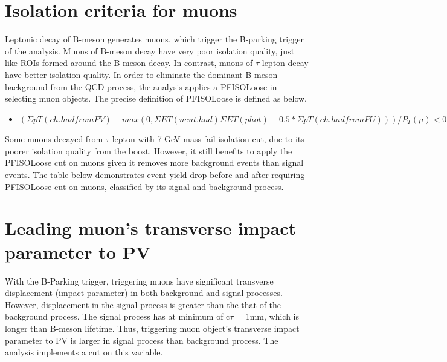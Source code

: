 \section{Isolation criteria for muons}\label{ref:muISO}
Leptonic decay of B-meson generates muons, which trigger the B-parking trigger of the analysis.
Muons of B-meson decay have very poor isolation quality, just like ROIs formed around the B-meson decay.
In contrast, muons of $\tau$ lepton decay have better isolation quality.
In order to eliminate the dominant B-meson background from the QCD process, the analysis applies a PFISOLoose in selecting muon objects.
The precise definition of PFISOLoose is defined as below.
\begin{itemize}
  \item $(\Sigma pT(ch.had from PV)+max(0,\Sigma ET(neut.had) \Sigma ET (phot)-0.5* \Sigma pT(ch.had from PU)))/P_{T}(\mu)<0.25$
\end{itemize}

Some muons decayed from $\tau$ lepton with 7 GeV mass fail isolation cut, due to its poorer isolation quality from the boost.
However, it still benefits to apply the PFISOLoose cut on muons given it removes more background events than signal events.
The table below demonstrates event yield drop before and after requiring PFISOLoose cut on muons, classified by its signal and background process. 


\section{Leading muon's transverse impact parameter to PV}\label{ref:muIP}
With the B-Parking trigger, triggering muons have significant transverse displacement (impact parameter) in both background and signal processes.
However, displacement in the signal process is greater than the that of the background process.
The signal process has at minimum of c$\tau$ = 1mm, which is longer than B-meson lifetime.
Thus, triggering muon object's transverse impact parameter to PV is larger in signal process than background process.
The analysis implements a cut on this variable.


